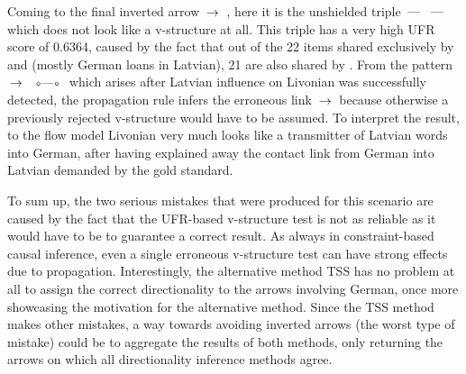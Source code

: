  Coming to the final inverted arrow  $\arrowLA$ , here it is the unshielded triple  $\arrowLL$  $\arrowLL$  which does not look like a v-structure at all. This triple has a very high UFR score of 0.6364, caused by the fact that out of the 22 items shared exclusively by  and  (mostly German loans in Latvian), 21 are also shared by . From the pattern  $\arrowLA$  $\arrowOO$  which arises after Latvian influence on Livonian was successfully detected, the propagation rule infers the erroneous link  $\arrowLA$  because otherwise a previously rejected v-structure would have to be assumed. To interpret the result, to the flow model Livonian very much looks like a transmitter of Latvian words into German, after having explained away the contact link from German into Latvian demanded by the gold standard.
 
 To sum up, the two serious mistakes that were produced for this scenario are caused by the fact that the UFR-based v-structure test is not as reliable as it would have to be to guarantee a correct result. As always in constraint-based causal inference, even a single erroneous v-structure test can have strong effects due to propagation. Interestingly, the alternative method TSS has no problem at all to assign the correct directionality to the arrows involving German, once more showcasing the motivation for the alternative method. Since the TSS method makes other mistakes, a way towards avoiding inverted arrows (the worst type of mistake) could be to aggregate the results of both methods, only returning the arrows on which all directionality inference methods agree.
 

